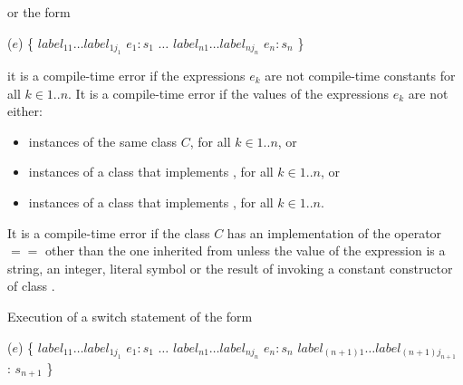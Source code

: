 \documentclass{article}
\begin{document}
 or the form

\begin{dartCode}
\SWITCH{} ($e$) \{
   $label_{11} \ldots label_{1j_1}$ \CASE{} $e_1: s_1$
   $\ldots$
   $label_{n1} \ldots label_{nj_n}$ \CASE{} $e_n: s_n$
\}
\end{dartCode}

 it is a compile-time error if the expressions $e_k$ are not compile-time constants for all $k \in 1..n$.
It is a compile-time error if the values of the expressions $e_k$ are not either:
\begin{itemize}
\item instances of the same class $C$, for all $k \in 1 .. n$, or
\item instances of a class that implements , for all $k \in 1 .. n$, or
\item instances of a class that implements , for all $k \in 1 .. n$.
\end{itemize}


\LMHash{}
It is a compile-time error if the class $C$ has an implementation of the operator $==$ other than the one inherited from  unless the value of the expression is a string, an integer, literal symbol or the result of invoking a constant constructor of class .



\LMHash{}
Execution of a switch statement of the form

\begin{dartCode}
\SWITCH{} ($e$) \{
   $label_{11} \ldots label_{1j_1}$ \CASE{} $e_1: s_1$
   $\ldots$
   $label_{n1} \ldots label_{nj_n}$ \CASE{} $e_n: s_n$
   $label_{(n+1)1} \ldots label_{(n+1)j_{n+1}}$ \DEFAULT{}: $s_{n+1}$
\}
\end{dartCode}
\end{document}
